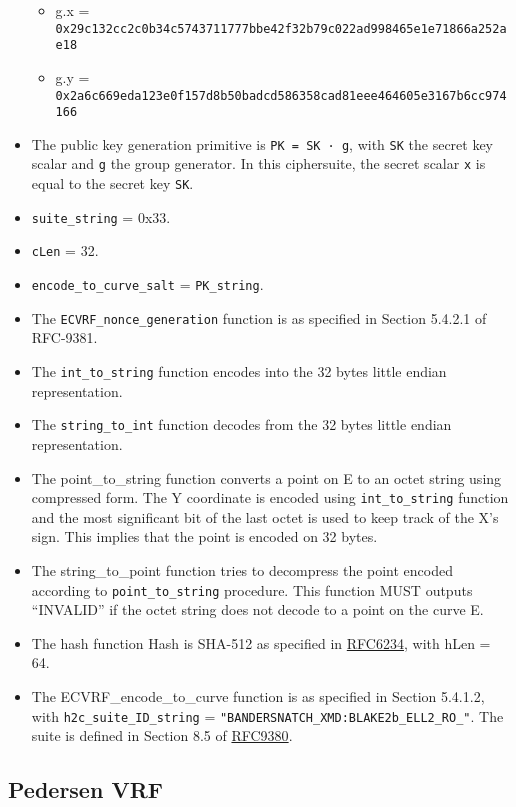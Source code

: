 \documentclass[
]{article}
\providecommand{\tightlist}{%
  \setlength{\itemsep}{0pt}\setlength{\parskip}{0pt}}
\begin{document}
\begin{itemize}
  \begin{itemize}
  \tightlist
  \item
    g.x =
    \texttt{0x29c132cc2c0b34c5743711777bbe42f32b79c022ad998465e1e71866a252ae18}
  \item
    g.y =
    \texttt{0x2a6c669eda123e0f157d8b50badcd586358cad81eee464605e3167b6cc974166}
  \end{itemize}
\item
  The public key generation primitive is \texttt{PK\ =\ SK\ ·\ g}, with
  \texttt{SK} the secret key scalar and \texttt{g} the group generator.
  In this ciphersuite, the secret scalar \texttt{x} is equal to the
  secret key \texttt{SK}.
\item
  \texttt{suite\_string} = 0x33.
\item
  \texttt{cLen} = 32.
\item
  \texttt{encode\_to\_curve\_salt} = \texttt{PK\_string}.
\item
  The \texttt{ECVRF\_nonce\_generation} function is as specified in
  Section 5.4.2.1 of RFC-9381.
\item
  The \texttt{int\_to\_string} function encodes into the 32 bytes little
  endian representation.
\item
  The \texttt{string\_to\_int} function decodes from the 32 bytes little
  endian representation.
\item
  The point\_to\_string function converts a point on E to an octet
  string using compressed form. The Y coordinate is encoded using
  \texttt{int\_to\_string} function and the most significant bit of the
  last octet is used to keep track of the X's sign. This implies that
  the point is encoded on 32 bytes.
\item
  The string\_to\_point function tries to decompress the point encoded
  according to \texttt{point\_to\_string} procedure. This function MUST
  outputs ``INVALID'' if the octet string does not decode to a point on
  the curve E.
\item
  The hash function Hash is SHA-512 as specified in
  \href{https://www.rfc-editor.org/rfc/rfc6234}{RFC6234}, with hLen =
  64.
\item
  The ECVRF\_encode\_to\_curve function is as specified in Section
  5.4.1.2, with \texttt{h2c\_suite\_ID\_string} =
  \texttt{"BANDERSNATCH\_XMD:BLAKE2b\_ELL2\_RO\_"}. The suite is defined
  in Section 8.5 of
  \href{https://datatracker.ietf.org/doc/rfc9380/}{RFC9380}.
\end{itemize}

\hypertarget{pedersen-vrf}{%
\subsection{Pedersen VRF}\label{pedersen-vrf}}
\end{document}
